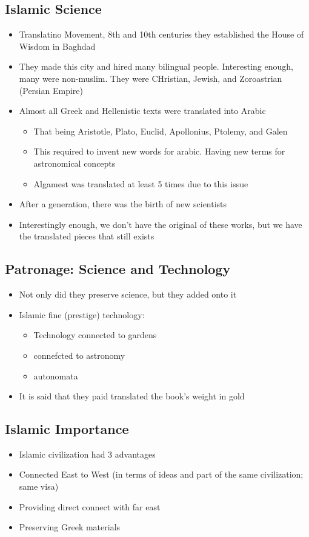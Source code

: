 \documentclass{article}
\begin{document}
\subsection{Islamic Science}
\begin{itemize}
  \item Translatino Movement, 8th and 10th centuries
    they established the House of Wisdom in Baghdad
  \item They made this city and hired many bilingual people.
    Interesting enough, many were non-muslim. They were CHristian, Jewish, and Zoroastrian (Persian Empire)
  \item Almost all Greek and Hellenistic texts were translated into Arabic
    \begin{itemize}
      \item That being Aristotle, Plato, Euclid, Apollonius, Ptolemy, and Galen
      \item This required to invent new words for arabic. Having new terms
        for astronomical concepts
      \item Algamest was translated at least 5 times due to this issue
    \end{itemize}
  \item After a generation, there was the birth of new scientists
  \item Interestingly enough, we don't have the original of these works,
    but we have the translated pieces that still exists
\end{itemize}

\subsection{Patronage: Science and Technology}
\begin{itemize}
  \item Not only did they preserve science, but
    they added onto it
  \item Islamic fine (prestige) technology:
    \begin{itemize}
      \item Technology connected to gardens
      \item connefcted to astronomy
      \item autonomata
    \end{itemize}
  \item It is said that they paid translated the book's weight in gold
\end{itemize}

\subsection{Islamic Importance}
\begin{itemize}
  \item Islamic civilization had 3 advantages
  \item Connected East to West (in terms of ideas and part of the same civilization; same visa)
  \item Providing direct connect with far east
  \item Preserving Greek materials
\end{itemize}
\end{document}
